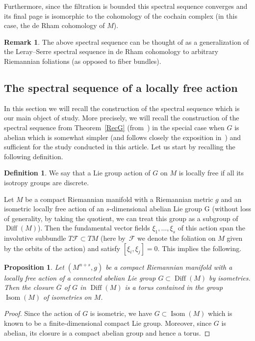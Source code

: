 \documentclass[10pt,a4paper]{amsart}
\numberwithin{equation}{section}
\newtheorem{prop}[tw]{Proposition}
\theoremstyle{definition}
\newtheorem{defi}[tw]{Definition}
\newtheorem{rem}[tw]{Remark}
\begin{document}
Furthermore, since the filtration is bounded this spectral sequence converges and its final page is isomorphic to the cohomology of the cochain complex (in this case, the de Rham cohomology of $M$).
\begin{rem} The above spectral sequence can be thought of as a generalization of the Leray--Serre spectral sequence in de Rham cohomology to arbitrary Riemannian foliations (as opposed to fiber bundles).
\end{rem}

\subsection{The spectral sequence of a locally free action}
In this section we will recall the construction of the spectral sequence which is our main object of study. More precisely, we will recall the construction of the spectral sequence from Theorem~\ref{RecG} (from~\cite{My4}) in the special case when $G$ is abelian which is somewhat simpler (and follows closely the exposition in~\cite{My3}) and sufficient for the study conducted in this article. Let us start by recalling the following definition.

\begin{defi} We say that a Lie group action of $G$ on $M$ is locally free if all its isotropy groups are discrete.
\end{defi}

Let $M$ be a compact Riemannian manifold with a Riemannian metric $g$ and an isometric locally free action of an $s$-dimensional abelian Lie group G (without loss of generality, by taking the quotient, we can treat this group as a subgroup of $\operatorname{Diff}(M)$). Then the fundamental vector fields $\xi_1,\dots,\xi_s$ of this action span the involutive subbundle $T\mathcal{F}\subset TM$ (here by~$\mathcal{F}$ we denote the foliation on $M$ given by the orbits of the action) and satisfy $[\xi_i,\xi_j]=0$. This implies the following.

\begin{prop} Let $(M^{n+s},g)$ be a compact Riemannian manifold with a locally free action of a connected abelian Lie group $G\subset \operatorname{Diff}(M)$ by isometries. Then the closure $\overline{G}$ of $G$ in $\operatorname{Diff}(M)$ is a torus contained in the group $\operatorname{Isom}(M)$ of isometries on $M$.
\end{prop}

\begin{proof} Since the action of $G$ is isometric, we have $G\subset \operatorname{Isom}(M)$ which is known to be a finite-dimensional compact Lie group. Moreover, since $G$ is abelian, its closure is a compact abelian group and hence a torus.
\end{proof}
\end{document}
